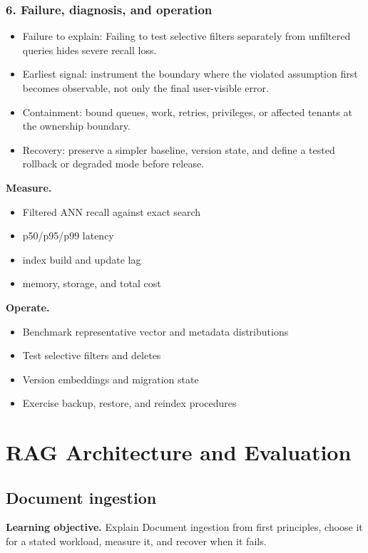 \subsubsection*{6. Failure, diagnosis, and operation}
\begin{itemize}
\item Failure to explain: Failing to test selective filters separately from unfiltered queries hides severe recall loss.
\item Earliest signal: instrument the boundary where the violated assumption first becomes observable, not only the final user-visible error.
\item Containment: bound queues, work, retries, privileges, or affected tenants at the ownership boundary.
\item Recovery: preserve a simpler baseline, version state, and define a tested rollback or degraded mode before release.
\end{itemize}
\textbf{Measure.}\begin{itemize}
\item Filtered ANN recall against exact search
\item p50/p95/p99 latency
\item index build and update lag
\item memory, storage, and total cost
\end{itemize}
\textbf{Operate.}\begin{itemize}
\item Benchmark representative vector and metadata distributions
\item Test selective filters and deletes
\item Version embeddings and migration state
\item Exercise backup, restore, and reindex procedures
\end{itemize}
\clearpage\section{RAG Architecture and Evaluation}
\subsection{Document ingestion}
\textbf{Learning objective.} Explain Document ingestion from first principles, choose it for a stated workload, measure it, and recover when it fails.
